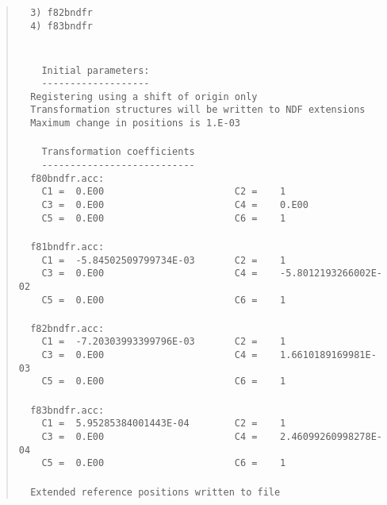 \begin{quote}
\begin{tabbing}
\verb#  3) f82bndfr#\\
\verb#  4) f83bndfr#\\
\verb##\\
\verb##\\
\verb#    Initial parameters:#\\
\verb#    -------------------#\\
\verb#  Registering using a shift of origin only#\\
\verb#  Transformation structures will be written to NDF extensions#\\
\verb#  Maximum change in positions is 1.E-03#\\
\verb##\\
\verb#    Transformation coefficients#\\
\verb#    ---------------------------#\\
\verb#  f80bndfr.acc:#\\
\verb#    C1 =  0.E00                       C2 =    1#\\
\verb#    C3 =  0.E00                       C4 =    0.E00#\\
\verb#    C5 =  0.E00                       C6 =    1#\\
\verb##\\
\verb#  f81bndfr.acc:#\\
\verb#    C1 =  -5.84502509799734E-03       C2 =    1#\\
\verb#    C3 =  0.E00                       C4 =    -5.8012193266002E-02#\\
\verb#    C5 =  0.E00                       C6 =    1#\\
\verb##\\
\verb#  f82bndfr.acc:#\\
\verb#    C1 =  -7.20303993399796E-03       C2 =    1#\\
\verb#    C3 =  0.E00                       C4 =    1.6610189169981E-03#\\
\verb#    C5 =  0.E00                       C6 =    1#\\
\verb##\\
\verb#  f83bndfr.acc:#\\
\verb#    C1 =  5.95285384001443E-04        C2 =    1#\\
\verb#    C3 =  0.E00                       C4 =    2.46099260998278E-04#\\
\verb#    C5 =  0.E00                       C6 =    1#\\
\verb##\\
\verb#  Extended reference positions written to file#\\

\end{tabbing}
\end{quote}
